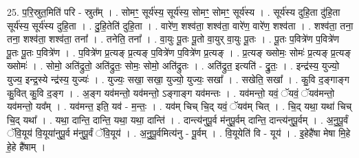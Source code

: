 \documentclass[17pt]{extarticle}
\begin{document}
25. प॒रि॒स्रुत॒मिति॑ परि - स्रुत᳚म् । . सोमꣳ॒॒ सूर्य॑स्य॒ सूर्य॑स्य॒ सोमꣳ॒॒ सोमꣳ॒॒ सूर्य॑स्य । . सूर्य॑स्य दुहि॒ता दु॑हि॒ता सूर्य॑स्य॒ सूर्य॑स्य दुहि॒ता । . दु॒हि॒तेति॑ दुहि॒ता । . वारे॑ण॒ शश्व॑ता॒ शश्व॑ता॒ वारे॑ण॒ वारे॑ण॒ शश्व॑ता । . शश्व॑ता॒ तना॒ तना॒ शश्व॑ता॒ शश्व॑ता॒ तना᳚ । . तनेति॒ तना᳚ । . वा॒युः पू॒तः पू॒तो वा॒युर् वा॒युः पू॒तः । . पू॒तः प॒वित्रे॑ण प॒वित्रे॑ण पू॒तः पू॒तः प॒वित्रे॑ण । . प॒वित्रे॑ण प्र॒त्यङ् प्र॒त्यङ् प॒वित्रे॑ण प॒वित्रे॑ण प्र॒त्यङ् । . प्र॒त्यङ् ख्सोमः॒ सोमः॑ प्र॒त्यङ् प्र॒त्यङ् ख्सोमः॑ । . सोमो॒ अति॑द्रुतो॒ अति॑द्रुतः॒ सोमः॒ सोमो॒ अति॑द्रुतः । . अति॑द्रुत॒ इत्यति॑ - द्रु॒तः॒ । . इन्द्र॑स्य॒ युज्यो॒ युज्य॒ इन्द्र॒स्ये न्द्र॑स्य॒ युज्यः॑ । . युज्यः॒ सखा॒ सखा॒ युज्यो॒ युज्यः॒ सखा᳚ । . सखेति॒ सखा᳚ । . कु॒वि द॒ङ्गाङ्ग कु॒वित् कु॒वि द॒ङ्ग । . अ॒ङ्ग यव॑मन्तो॒ यव॑मन्तो॒ ऽङ्गाङ्ग यव॑मन्तः । . यव॑मन्तो॒ यवं॒ ॅयवं॒ ॅयव॑मन्तो॒ यव॑मन्तो॒ यव᳚म् । . यव॑मन्त॒ इति॒ यव॑ - म॒न्तः॒ । . यव॑म् चिच् चि॒द् यवं॒ ॅयव॑म् चित् । . चि॒द् यथा॒ यथा॑ चिच् चि॒द् यथा᳚ । . यथा॒ दान्ति॒ दान्ति॒ यथा॒ यथा॒ दान्ति॑ । . दान्त्य॑नुपू॒र्व म॑नुपू॒र्वम् दान्ति॒ दान्त्य॑नुपू॒र्वम् । . अ॒नु॒पू॒र्वं ॅवि॒यूय॑ वि॒यूया॑नुपू॒र्व म॑नुपू॒र्वं ॅवि॒यूय॑ । . अ॒नु॒पू॒र्वमित्य॑नु - पू॒र्वम् । . वि॒यूयेति॑ वि - यूय॑ । . इ॒हेहै॑षा मेषा मि॒हे हे॒हे है॑षाम् । \newline
\end{document}
